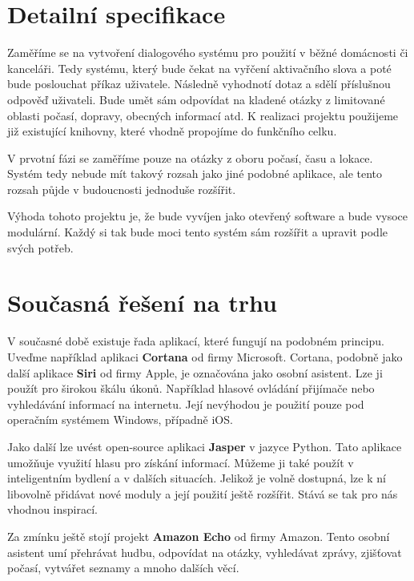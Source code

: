 \documentclass[12pt,a4paper]{article}
\begin{document}
\section*{Detailní specifikace}
Zaměříme se na vytvoření dialogového systému pro použití v běžné domácnosti či kanceláři. Tedy systému, který bude čekat na vyřčení aktivačního slova a poté bude poslouchat příkaz uživatele. Následně vyhodnotí dotaz a sdělí příslušnou odpověď uživateli. Bude umět sám odpovídat na kladené otázky z limitované oblasti počasí, dopravy, obecných informací atd. K realizaci projektu použijeme již existující knihovny, které vhodně propojíme do funkčního celku.

V prvotní fázi se zaměříme pouze na otázky z oboru počasí, času a lokace. Systém tedy nebude mít takový rozsah jako jiné podobné aplikace, ale tento rozsah půjde v budoucnosti jednoduše rozšířit.

Výhoda tohoto projektu je, že bude vyvíjen jako otevřený software a bude vysoce modulární. Každý si tak bude moci tento systém sám rozšířit a upravit podle svých potřeb.

\section*{Současná řešení na trhu}
V současné době existuje řada aplikací, které fungují na podobném principu. Uveďme například aplikaci \textbf{Cortana} od firmy Microsoft. Cortana, podobně jako další aplikace \textbf{Siri} od firmy Apple, je označována jako osobní asistent. Lze ji použít pro širokou škálu úkonů. Například hlasové ovládání přijímače nebo vyhledávání informací na internetu. Její nevýhodou je použití pouze pod operačním systémem Windows, případně iOS. 

Jako další lze uvést open-source aplikaci \textbf{Jasper} v jazyce Python. Tato aplikace umožňuje využití hlasu pro získání informací. Můžeme ji také použít v inteligentním bydlení a v dalších situacích. Jelikož je volně dostupná, lze k ní libovolně přidávat nové moduly a její použití ještě rozšířit. Stává se tak pro nás vhodnou inspirací. 

Za zmínku ještě stojí projekt \textbf{Amazon Echo} od firmy Amazon. Tento osobní asistent umí přehrávat hudbu, odpovídat na otázky, vyhledávat zprávy, zjišťovat počasí, vytvářet seznamy a mnoho dalších věcí. 
\end{document}
